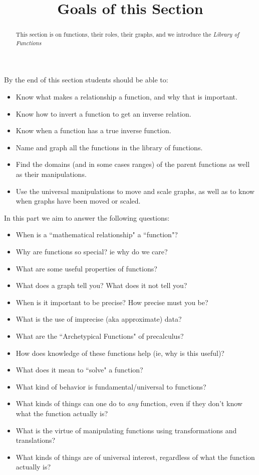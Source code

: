 \documentclass{ximera}
\title{Goals of this Section}
\begin{document}
\begin{abstract}
    This section is on functions, their roles, their graphs, and we introduce the \textit{Library of Functions}
\end{abstract}
\maketitle
By the end of this section students should be able to:

\begin{itemize}
    \item Know what makes a relationship a function, and why that is important.
    \item Know how to invert a function to get an inverse relation.
    \item Know when a function has a true inverse function.
    \item Name and graph all the functions in the library of functions.
    \item Find the domains (and in some cases ranges) of the parent functions as well as their manipulations.
    \item Use the universal manipulations to move and scale graphs, as well as to know when graphs have been moved or scaled.
\end{itemize}

In this part we aim to answer the following questions:

\begin{itemize}
    \item When is a ``mathematical relationship" a ``function"?
    \item Why are functions so special? ie why do we care?
    \item What are some useful properties of functions?
    \item What does a graph tell you? What does it not tell you?
    \item When is it important to be precise? How precise must you be?
    \item What is the use of imprecise (aka approximate) data?
    \item What are the ``Archetypical Functions" of precalculus?
    \item How does knowledge of these functions help (ie, why is this useful)?
    \item What does it mean to ``solve" a function?
    \item What kind of behavior is fundamental/universal to functions?
    \item What kinds of things can one do to \emph{any} function, even if they don't know what the function actually is?
    \item What is the virtue of manipulating functions using transformations and translations?
    \item What kinds of things are of universal interest, regardless of what the function actually is?
\end{itemize}
\end{document}
